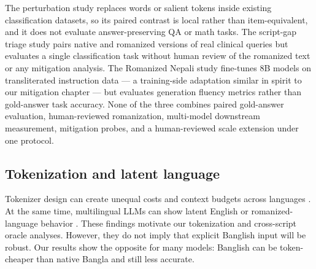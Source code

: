 The perturbation study replaces words or salient tokens inside existing classification datasets, so its paired contrast is local rather than item-equivalent, and it does not evaluate answer-preserving QA or math tasks. The script-gap triage study pairs native and romanized versions of real clinical queries but evaluates a single classification task without human review of the romanized text or any mitigation analysis. The Romanized Nepali study fine-tunes 8B models on transliterated instruction data --- a training-side adaptation similar in spirit to our mitigation chapter --- but evaluates generation fluency metrics rather than gold-answer task accuracy. None of the three combines paired gold-answer evaluation, human-reviewed romanization, multi-model downstream measurement, mitigation probes, and a human-reviewed scale extension under one protocol.

\subsection{Tokenization and latent language}

Tokenizer design can create unequal costs and context budgets across languages \cite{tokenizerfairness2023}. At the same time, multilingual LLMs can show latent English or romanized-language behavior \cite{wendler-etal-2024-llamas,thinkenglish2025,romanlens2025}. These findings motivate our tokenization and cross-script oracle analyses. However, they do not imply that explicit Banglish input will be robust. Our results show the opposite for many models: Banglish can be token-cheaper than native Bangla and still less accurate.

\endinput
